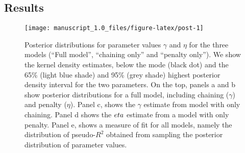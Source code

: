 \documentclass[]{rsos}%
\begin{document}
\hypertarget{results}{%
\subsection{Results}\label{results}}












\begin{figure}

{\centering \texttt{[image: manuscript\_1.0\_files/figure-latex/post-1]} 

}

\caption{Posterior distributions for parameter values \(\gamma\) and \(\eta\) for
the three models (``Full model'', ``chaining only'' and ``penalty only''). We show
the kernel density estimates, below the mode (black dot) and the 65\%
(light blue shade) and 95\% (grey shade) highest posterior density interval
for the two parameters. On the top, panels a and b show posterior
distributions for a full model, including chaining (\(\gamma\)) and penalty
(\(\eta\)). Panel c, shows the \(\gamma\) estimate from model with only chaining.
Panel d shows the \(\\eta\) estimate from a model with only penalty. Panel e,
shows a measure of fit for all models, namely the distribution of pseudo-\(R^2\)
obtained from sampling the posterior distribution of parameter values.}\label{fig:post}
\end{figure}
\end{document}
